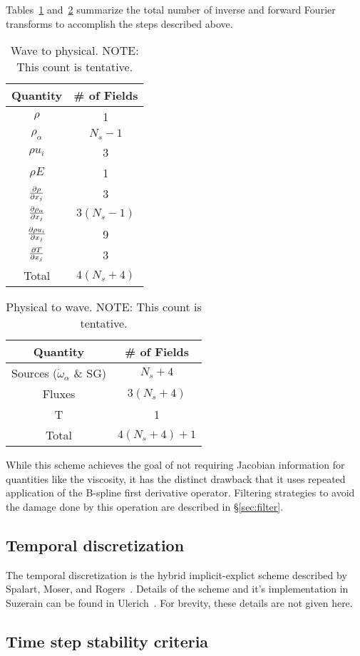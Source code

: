 Tables~\ref{tbl:w2p} and~\ref{tbl:p2w} summarize the total number of
inverse and forward Fourier transforms to accomplish the steps
described above.
%
\begin{table}[ht]
\caption{Wave to physical.  NOTE: This count is tentative.}
\begin{tabular}{|c|c|}
\hline
Quantity & \# of Fields \\
\hline
\hline
$\rho$ & 1 \\
$\rho_{\alpha}$ & $N_s - 1$ \\
$\rho u_i$ & 3 \\
$\rho E$ & 1 \\
$\frac{\partial \rho}{\partial x_j}$ & 3 \\
$\frac{\partial \rho_{\alpha}}{\partial x_j}$ & $3 (N_s - 1)$ \\
$\frac{\partial \rho u_i}{\partial x_j}$ & 9 \\
$\frac{\partial T}{\partial x_j}$ & 3 \\
\hline
Total & $4(N_s + 4)$\\
\hline
\end{tabular}
\label{tbl:w2p}
\end{table}
% 
%
\begin{table}[ht]
\caption{Physical to wave.  NOTE: This count is tentative.}
\begin{tabular}{|c|c|}
\hline
Quantity & \# of Fields \\
\hline
\hline
Sources ($\dot{\omega}_{\alpha}$ \& SG) & $N_s + 4$ \\
Fluxes & $3 (N_s +4)$ \\
T & 1 \\
\hline
Total & $4(N_s + 4) + 1$\\
\hline
\end{tabular}
\label{tbl:p2w}
\end{table}
% 

While this scheme achieves the goal of not requiring Jacobian
information for quantities like the viscosity, it has the distinct
drawback that it uses repeated application of the B-spline first
derivative operator.  Filtering strategies to avoid the damage done by
this operation are described in \S\ref{sec:filter}.


\subsection{Temporal discretization}
\label{sec:temporal_discretization}
The temporal discretization is the hybrid implicit-explict scheme
described by Spalart, Moser, and Rogers~\cite{spalart_lowstoragerk}.
Details of the scheme and it's implementation in Suzerain can be found
in Ulerich~\cite{?}.  For brevity, these details are not given here.

\subsection{Time step stability criteria}
\label{sec:stabilitycriteria}
